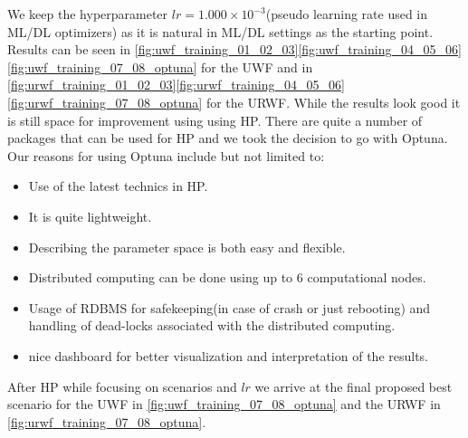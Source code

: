 We keep the hyperparameter $lr=1.000\times10^{-3}$(pseudo learning rate used in \ac{ML}/\ac{DL} optimizers\cite{Google2023}\cite{Chollet2023}\cite{LFMAI2023}\cite{Sun2019}) as it is natural in \ac{ML}/\ac{DL} settings as the starting point\cite{Google2023}\cite{Chollet2023}\cite{LFMAI2023}. 
Results can be seen in \cref{fig:uwf_training_01_02_03}\cref{fig:uwf_training_04_05_06}\cref{fig:uwf_training_07_08_optuna} 
for the \ac{UWF} and in \cref{fig:urwf_training_01_02_03}\cref{fig:urwf_training_04_05_06}\cref{fig:urwf_training_07_08_optuna} 
for the \ac{URWF}. While the results look good it is still space for improvement using using \ac{HP}\cite{Hutter2019}. There are quite 
a number of packages that can be used for \ac{HP} and we took the decision to go with Optuna\cite{Akiba2019}. Our reasons for using Optuna\cite{Akiba2019} include but not limited to:
\begin{itemize}
  \item Use of the latest technics in \ac{HP}\cite{Hutter2019}\cite{Akiba2019}.
  \item It is quite lightweight.
  \item Describing the parameter space is both easy and flexible.
  \item Distributed computing can be done using up to 6 computational nodes.
  \item Usage of \ac{RDBMS} for safekeeping(in case of crash or just rebooting) and handling of dead-locks associated with the distributed computing.
  \item nice dashboard for better visualization and interpretation of the results.  
\end{itemize}
After \ac{HP} while focusing on scenarios and $lr$ we arrive at the final proposed best scenario for the \ac{UWF} in 
\cref{fig:uwf_training_07_08_optuna} and the \ac{URWF} in \cref{fig:urwf_training_07_08_optuna}.

